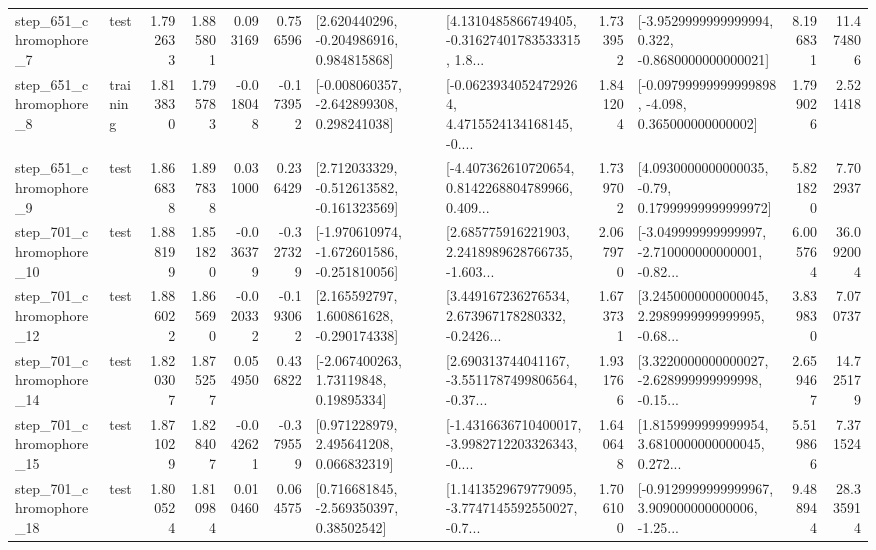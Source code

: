 \begin{tabular}{llrrrrllrlrr}
   step\_651\_chromophore\_7 &      test &      1.792633 &    1.885801 &      0.093169 &  0.756596 &    [2.620440296, -0.204986916, 0.984815868] &  [4.1310485866749405, -0.31627401783533315, 1.8... &       1.733952 &  [-3.9529999999999994, 0.322, -0.8680000000000021] &            8.196831 &         11.474806 \\
   step\_651\_chromophore\_8 &  training &      1.813830 &    1.795783 &     -0.018048 & -0.173952 &   [-0.008060357, -2.642899308, 0.298241038] &  [-0.06239340524729264, 4.4715524134168145, -0.... &       1.841204 &  [-0.09799999999999898, -4.098, 0.365000000000002] &            1.799026 &          2.521418 \\
   step\_651\_chromophore\_9 &      test &      1.866838 &    1.897838 &      0.031000 &  0.236429 &   [2.712033329, -0.512613582, -0.161323569] &  [-4.407362610720654, 0.8142268804789966, 0.409... &       1.739702 &   [4.0930000000000035, -0.79, 0.17999999999999972] &            5.821820 &          7.702937 \\
  step\_701\_chromophore\_10 &      test &      1.888199 &    1.851820 &     -0.036379 & -0.327329 &  [-1.970610974, -1.672601586, -0.251810056] &  [2.685775916221903, 2.2418989628766735, -1.603... &       2.067970 &  [-3.049999999999997, -2.710000000000001, -0.82... &            6.005764 &         36.092004 \\
  step\_701\_chromophore\_12 &      test &      1.886022 &    1.865690 &     -0.020332 & -0.193062 &    [2.165592797, 1.600861628, -0.290174338] &  [3.449167236276534, 2.673967178280332, -0.2426... &       1.673731 &  [3.2450000000000045, 2.2989999999999995, -0.68... &            3.839830 &          7.070737 \\
  step\_701\_chromophore\_14 &      test &      1.820307 &    1.875257 &      0.054950 &  0.436822 &      [-2.067400263, 1.73119848, 0.19895334] &  [2.690313744041167, -3.5511787499806564, -0.37... &       1.931766 &  [3.3220000000000027, -2.628999999999998, -0.15... &            2.659467 &         14.725179 \\
  step\_701\_chromophore\_15 &      test &      1.871029 &    1.828407 &     -0.042621 & -0.379559 &     [0.971228979, 2.495641208, 0.066832319] &  [-1.4316636710400017, -3.9982712203326343, -0.... &       1.640648 &  [1.8159999999999954, 3.6810000000000045, 0.272... &            5.519866 &          7.371524 \\
  step\_701\_chromophore\_18 &      test &      1.800524 &    1.810984 &      0.010460 &  0.064575 &     [0.716681845, -2.569350397, 0.38502542] &  [1.1413529679779095, -3.7747145592550027, -0.7... &       1.706100 &  [-0.9129999999999967, 3.909000000000006, -1.25... &            9.488944 &         28.335914 \\

\end{tabular}
